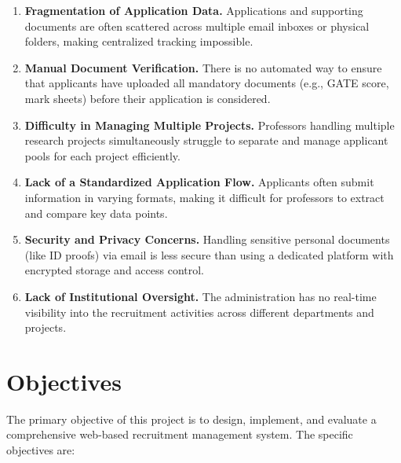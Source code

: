 \begin{enumerate}
  \item \textbf{Fragmentation of Application Data.} Applications and supporting documents are often scattered across multiple email inboxes or physical folders, making centralized tracking impossible.
  
  \item \textbf{Manual Document Verification.} There is no automated way to ensure that applicants have uploaded all mandatory documents (e.g., GATE score, mark sheets) before their application is considered.
  
  \item \textbf{Difficulty in Managing Multiple Projects.} Professors handling multiple research projects simultaneously struggle to separate and manage applicant pools for each project efficiently.
  
  \item \textbf{Lack of a Standardized Application Flow.} Applicants often submit information in varying formats, making it difficult for professors to extract and compare key data points.
  
  \item \textbf{Security and Privacy Concerns.} Handling sensitive personal documents (like ID proofs) via email is less secure than using a dedicated platform with encrypted storage and access control.
  
  \item \textbf{Lack of Institutional Oversight.} The administration has no real-time visibility into the recruitment activities across different departments and projects.
\end{enumerate}

\section{Objectives}

The primary objective of this project is to design, implement, and evaluate a comprehensive web-based recruitment management system. The specific objectives are:

